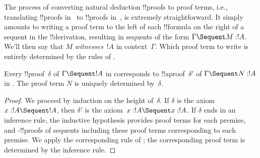\documentclass[../../../include/open-logic-section]{subfiles}
\begin{document}


The process of converting natural deduction !!{proof}s to proof terms,
i.e., translating !!{proof}s in~ to !!{proof}s in~,
is extremely straightforward. It simply amounts to writing a proof
term to the left of each !!{formula} on the right of a sequent in the
!!{derivation}, resulting in sequents of the form $\Gamma \Sequent M :
!A$.  We'll then say that $M$ \emph{witnesses}~$!A$ in
context~$\Gamma$. Which proof term to write is entirely determined by
the rules of .

\begin{prop}
Every !!{proof}~$\delta$ of $\Gamma \Sequent !A$ in 
corresponds to !!a{proof}~$\delta'$ of $\Gamma \Sequent N : !A$ in
. The proof term $N$ is uniquely determined by~$\delta$.
\end{prop}

\begin{proof}
We proceed by induction on the height of~$\delta$. If $\delta$ is the
axiom $x:!A \Sequent !A$, then $\delta'$ is the axiom~$x:!A \Sequent
x:!A$. If $\delta$ ends in an inference rule, the inductive hypothesis
provides proof terms for each premise, and -!!{proof}s of
sequents including these proof terms  corresponding to each premise.
We apply the corresponding rule of ; the corresponding proof
term is determined by the  inference rule.
\end{proof}
\end{document}
